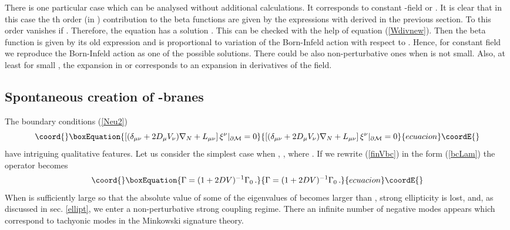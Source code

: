 \documentclass[a4paper,12pt]{article}
\providecommand{\oB}{|_{\partial{\cal M}}}
\begin{document}
There is one particular case which can be analysed without
additional calculations. It corresponds to constant \coordHE{}-field or
\coordHE{}.
It is clear that in this case the \coordHE{}th order (in \coordHE{}) 
contribution to the beta functions are given by
the expressions with \coordHE{} derived in the previous
section. To this order  
\coordHE{} vanishes if \coordHE{} . 
Therefore,
the equation \coordHE{} has a solution \coordHE{}.
This can be checked with the help of equation (\ref{Wdivnew}).
Then the beta function \coordHE{} is given by its
old expression and is proportional to variation
of the Born-Infeld action with respect to \coordHE{}.
Hence, for  constant \coordHE{} field we reproduce the
Born-Infeld action as one of the possible solutions.
There could be also non-perturbative ones when \coordHE{} is
not small. Also, at least for small \coordHE{}, the expansion
in \coordHE{} or \coordHE{} corresponds to an expansion in derivatives of
the \coordHE{} field.



\subsection{Spontaneous creation of \coordHE{}-branes}\label{Dbranes}
The boundary
conditions (\ref{Neu2})
\begin{equation}\coord{}\boxEquation{
\left[ (\delta_{\mu\nu}+2D_\mu V_\nu )\nabla_N
 +L_{\mu\nu} \right]\xi^\nu \oB =0 \label{finVbc}
}{
\left[ (\delta_{\mu\nu}+2D_\mu V_\nu )\nabla_N
 +L_{\mu\nu} \right]\xi^\nu \oB =0 }{ecuacion}\coordE{}\end{equation}
have intriguing qualitative features. Let us consider the simplest case when
\coordHE{}, \coordHE{}, where \coordHE{}.
If we rewrite  (\ref{finVbc}) in the form
(\ref{bcLam}) the operator \myHighlight{$\Gamma$}\coordHE{} becomes
\begin{equation}\coord{}\boxEquation{
\Gamma = (1+2DV )^{-1}\Gamma_0 \,. \label{Gam}
}{
\Gamma = (1+2DV )^{-1}\Gamma_0 \,. }{ecuacion}\coordE{}\end{equation}
When \coordHE{} is sufficiently large
so that the absolute value of some of the eigenvalues
of \myHighlight{$\Gamma$}\coordHE{} becomes larger than \coordHE{}, strong ellipticity
is lost, and, as discussed in sec. \ref{ellipt}, we
enter a non-perturbative strong coupling regime.
There an infinite number of negative modes
appears which correspond to tachyonic modes in
the Minkowski signature theory.
\end{document}
